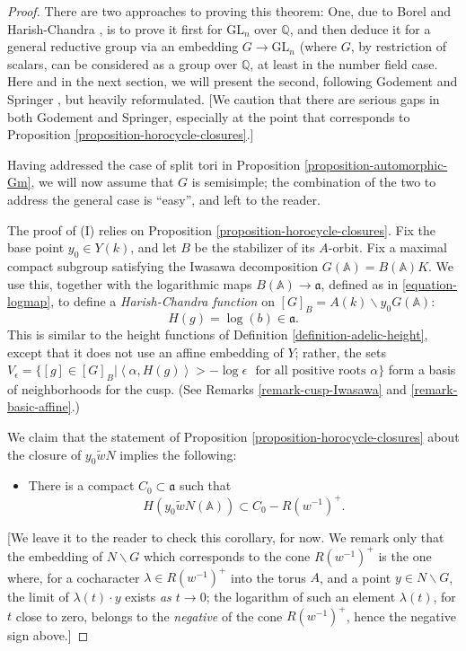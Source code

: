\begin{proof}
There are two approaches to proving this theorem: One, due to Borel and Harish-Chandra \cite{Borel-HC}, is to prove it first for $\text{GL}_n$ over $\mathbb Q$, and then deduce it for a general reductive group via an embedding $G\to \text{GL}_n$ (where $G$, by restriction of scalars, can be considered as a group over $\mathbb Q$, at least in the number field case. Here and in the next section, we will present the second, following Godement \cite{Godement-domaines-fondamentaux} and Springer \cite{Springer-reduction-theory}, but heavily reformulated. [We caution that there are serious gaps in both Godement and Springer, especially at the point that corresponds to Proposition \ref{proposition-horocycle-closures}.]

Having addressed the case of split tori in Proposition \ref{proposition-automorphic-Gm}, we will now assume that $G$ is semisimple; the combination of the two to address the general case is ``easy'', and left to the reader. 



The proof of (I) relies on Proposition \ref{proposition-horocycle-closures}.  Fix the base point $y_0\in Y(k)$, and let $B$ be the stabilizer of its $A$-orbit. Fix a maximal compact subgroup satisfying the Iwasawa decomposition $G(\mathbb A) = B(\mathbb A) K$. We use this, together with the logarithmic maps $B(\mathbb A)\to \mathfrak a$, defined as in \eqref{equation-logmap}, to define a {\it Harish-Chandra function}  on $[G]_B = A(k)\backslash y_0 G(\mathbb A)$:
$$H(g) = \log(b)\in \mathfrak a.$$ 
This is similar to the height functions of Definition \ref{definition-adelic-height}, except that it does not use an affine embedding of $Y$; rather, the sets $V_\epsilon = \{ [g] \in [G]_B| \left < \alpha, H(g) \right > > -\log \epsilon \,\, \mbox{ for all positive roots } \alpha\}$ form a basis of neighborhoods for the cusp. (See Remarks  \ref{remark-cusp-Iwasawa} and \ref{remark-basic-affine}.)

We claim that the statement of Proposition \ref{proposition-horocycle-closures} about the closure of $y_0 \tilde w N$ implies the following:

\begin{itemize}
 \item There is a compact $C_0\subset \mathfrak a$ such that 
\begin{equation}
 \label{equation-bound-height}
H(y_0 \tilde w N(\mathbb A)) \subset C_0 - R(w^{-1})^+.
\end{equation}
\end{itemize}
[We leave it to the reader to check this corollary, for now. We remark only that the embedding of $N\backslash G$ which corresponds to the cone $R(w^{-1})^+$ is the one where, for a cocharacter $\lambda\in R(w^{-1})^+$ into the torus $A$, and a point $y\in N\backslash G$, the limit of $\lambda(t)\cdot y$ exists \emph{as $t\to 0$}; the logarithm of such an element $\lambda(t)$, for $t$ close to zero, belongs to the \emph{negative} of the cone $R(w^{-1})^+$, hence the negative sign above.]



\end{proof}
